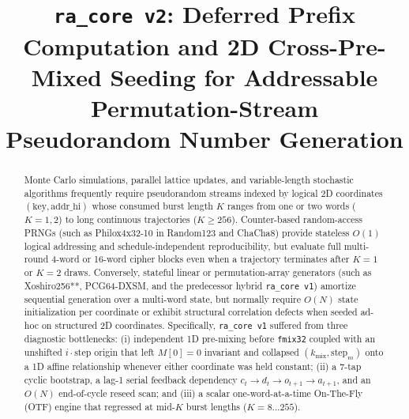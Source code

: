 \documentclass[conference]{IEEEtran}
\begin{document}
\title{\texttt{ra\_core v2}: Deferred Prefix Computation and 2D Cross-Pre-Mixed Seeding for Addressable Permutation-Stream Pseudorandom Number Generation}

\author{
}

\maketitle

\begin{abstract}
Monte Carlo simulations, parallel lattice updates, and variable-length stochastic algorithms frequently require pseudorandom streams indexed by logical 2D coordinates $(\text{key}, \text{addr\_hi})$ whose consumed burst length $K$ ranges from one or two words ($K=1, 2$) to long continuous trajectories ($K \ge 256$). Counter-based random-access PRNGs (such as Philox4x32-10 in Random123 and ChaCha8) provide stateless $O(1)$ logical addressing and schedule-independent reproducibility, but evaluate full multi-round 4-word or 16-word cipher blocks even when a trajectory terminates after $K=1$ or $K=2$ draws. Conversely, stateful linear or permutation-array generators (such as Xoshiro256**, PCG64-DXSM, and the predecessor hybrid \texttt{ra\_core v1}) amortize sequential generation over a multi-word state, but normally require $O(N)$ state initialization per coordinate or exhibit structural correlation defects when seeded ad-hoc on structured 2D coordinates. Specifically, \texttt{ra\_core v1} suffered from three diagnostic bottlenecks: (i) independent 1D pre-mixing before \texttt{fmix32} coupled with an unshifted $i \cdot \text{step}$ origin that left $M[0]=0$ invariant and collapsed $(k_{\text{mix}}, \text{step}_m)$ onto a 1D affine relationship whenever either coordinate was held constant; (ii) a 7-tap cyclic bootstrap, a lag-1 serial feedback dependency $c_t \to d_t \to o_{t+1} \to a_{t+1}$, and an $O(N)$ end-of-cycle reseed scan; and (iii) a scalar one-word-at-a-time On-The-Fly (OTF) engine that regressed at mid-$K$ burst lengths ($K=8\ldots 255$).


\end{abstract}
\end{document}
